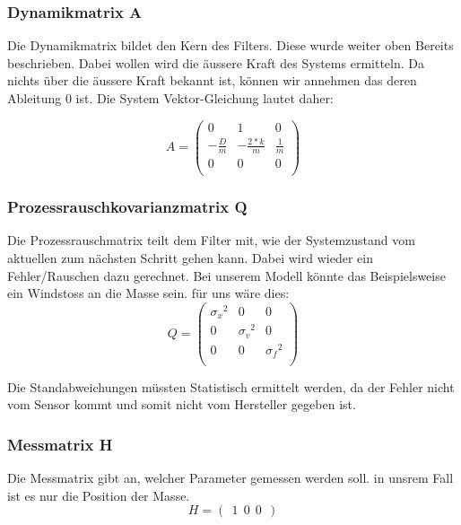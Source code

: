 \documentclass[11pt,a4paper]{article}
\begin{document}
\subsubsection*{Dynamikmatrix A}
Die Dynamikmatrix bildet den Kern des Filters. Diese wurde weiter oben Bereits beschrieben. Dabei wollen wird die äussere Kraft des Systems ermitteln.
Da nichts über die äussere Kraft bekannt ist, können wir annehmen das deren Ableitung 0 ist.
Die System Vektor-Gleichung lautet daher:


\begin{equation}
A = \left(
 \begin{array}{ccc} 	
0 & 1& 0 \\
- \frac{D}{m} &-\frac{2*k}{m} & \frac{1} {m}\\
0 & 0& 0\\ 
\end{array}\right)  
\end{equation} 

\subsubsection*{Prozessrauschkovarianzmatrix Q}
Die Prozessrauschmatrix teilt dem Filter mit, wie der Systemzustand vom aktuellen zum nächsten Schritt gehen kann. Dabei wird wieder ein Fehler/Rauschen dazu gerechnet. Bei unserem Modell könnte das Beispielsweise ein Windstoss an die Masse sein. für uns wäre dies:
\begin{equation}
Q = \left(
 \begin{array}{ccc} 	
{\sigma_x }^2& 0& 0 \\ 
0 & {\sigma_v }^2& 0\\ 
0 & 0& {\sigma_f }^2\\
\end{array}\right)  
\end{equation} 

Die Standabweichungen müssten Statistisch ermittelt werden, da der Fehler nicht vom Sensor kommt und somit nicht vom Hersteller gegeben ist. 

\subsubsection*{Messmatrix H}
Die Messmatrix gibt an, welcher Parameter gemessen werden soll. in unsrem Fall ist es nur die Position der Masse. 
\begin{equation}
H= ( \: \: 1 \: \:0 \: \:0 \: \:)
\end{equation} 
\end{document}
